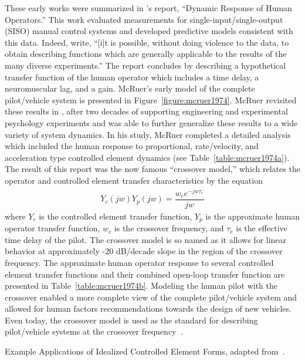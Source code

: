 These early works were summarized in \citeauthor{mcruer_dynamic_1957}'s report, ``Dynamic Response of Human Operators.''
This work evaluated measurements for single-input/single-output (SISO) manual control systems and developed predictive models consistent with this data.
Indeed, \citeauthor*{mcruer_dynamic_1957} write, ``[i]t is possible, without doing violence to the data, to obtain describing functions which are generally applicable to the results of the many diverse experiments.''
The report concludes by describing a hypothetical transfer function of the human operator which includes a time delay, a neuromuscular lag, and a gain.
McRuer's early model of the complete pilot/vehicle system is presented in Figure~\ref{figure:mcruer1974}.
McRuer revisited these results in \citeyear{mcruer_mathematical_1974}, after two decades of supporting engineering and experimental psychology experiments and was able to further generalize these results to a wide variety of system dynamics.
In his study, McRuer completed a detailed analysis which included the human response to proportional, rate/velocity, and acceleration type controlled element dynamics (see Table~\ref{table:mcruer1974a}).
The result of this report was the now famous ``crossover model,'' which relates the operator and controlled element transfer characteristics by the equation
\begin{align}
    Y_c(jw) Y_p(jw) = \dfrac{w_c e^{-jw \tau_e}}{jw}
\end{align}
where $Y_c$ is the controlled element transfer function, $Y_p$ is the approximate human operator transfer function, $w_c$ is the crossover frequency, and $\tau_e$ is the effective time delay of the pilot.
The crossover model is so named as it allows for linear behavior at approximately -20 dB/decade slope in the region of the crossover frequency.
The approximate human operator response to several controlled element transfer functions and their combined open-loop transfer function are presented in Table~\ref{table:mcruer1974b}.
Modeling the human pilot with the crossover enabled a more complete view of the complete pilot/vehicle system and allowed for human factors recommendations towards the design of new vehicles.
Even today, the crossover model is used as the standard for describing pilot/vehicle systems at the crossover frequency~\citep{mcruer_human_1965, mcruer_mathematical_1974, xu_review_2017}.

\begin{table}[tb]
    \centering
    \caption[Example Applications of Idealized Controlled Element Forms]{Example Applications of Idealized Controlled Element Forms, adapted from~\citet{mcruer_mathematical_1974}.}
    \label{table:mcruer1974a}
\end{table}


